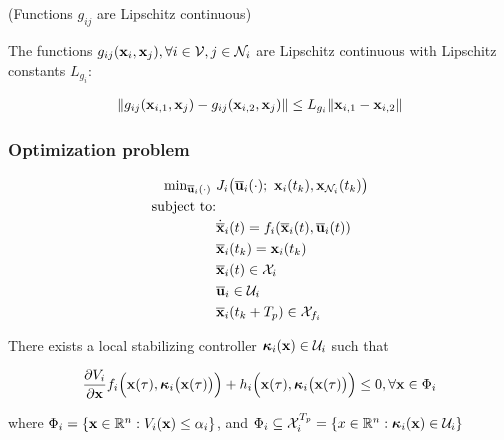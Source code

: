 \begin{gg_box}
\begin{assumption} (Functions $g_{ij}$ are Lipschitz continuous)

  The functions $g_{ij}(\bm{\mathbf{x}}_i, \bm{\mathbf{x}}_j), \forall i \in \mathcal{V}, j \in \mathcal{N}_i$ are
  Lipschitz continuous with Lipschitz constants $L_{g_i}$:

  \begin{align}
    \| g_{ij}(\bm{\mathbf{x}}_{i,1}, \bm{\mathbf{x}}_j) - g_{ij}(\bm{\mathbf{x}}_{i,2}, \bm{\mathbf{x}}_j)\| \leq L_{g_i} \|\bm{\mathbf{x}}_{i,1} - \bm{\mathbf{x}}_{i,2} \|
  \end{align}

  \label{ass:g_ij_Lipschitz}
\end{assumption}
\end{gg_box}

\subsubsection{Optimization problem}

\begin{align}
  \text{min}_{\overline{\bm{\mathbf{u}}}_i (\cdot)}\ &
    J_i \big(\overline{\bm{\mathbf{u}}}_i (\cdot);\ \bm{\mathbf{x}}_i(t_k), \bm{\mathbf{x}}_{\mathcal{N}_i}(t_k)\big) \\
  \text{subject to:} & \\
  & \dot{\overline{\bm{\mathbf{x}}}}_i(t) = f_i (\overline{\bm{\mathbf{x}}}_i (t), \overline{\bm{\mathbf{u}}}_i (t)) \\
  & \overline{\bm{\mathbf{x}}}_i (t_k) = \bm{\mathbf{x}}_i (t_k) \\
  & \overline{\bm{\mathbf{x}}}_i (t) \in \mathcal{X}_i \\
  & \overline{\bm{\mathbf{u}}}_i \in \mathcal{U}_i \\
  & \overline{\bm{\mathbf{x}}}_i (t_k + T_p) \in \mathcal{X}_{f_i} \\
\end{align}

\begin{gg_box}
\begin{assumption}

  There exists a local stabilizing controller
  $\bm{\mathbf{\kappa}}_i(\bm{\mathbf{x}}) \in \mathcal{U}_i$ such that

  \begin{align}
    \dfrac{\partial V_i}{\partial \bm{\mathbf{x}}} f_i \Big(\bm{\mathbf{x}}(\tau), \bm{\mathbf{\kappa}}_i\big(\bm{\mathbf{x}}(\tau)\big)\Big) +
      h_i\Big(\bm{\mathbf{x}}(\tau), \bm{\mathbf{\kappa}}_i \big(\bm{\mathbf{x}}(\tau)\big)\Big) \leq 0, \forall \bm{\mathbf{x}} \in \Phi_i
  \end{align}

  where $\Phi_i = \{\bm{\mathbf{x}} \in \mathbb{R}^n : V_i(\bm{\mathbf{x}}) \leq \alpha_i \}$, and
  $\Phi_i \subseteq \mathcal{X}_i^{T_p} = \{x \in \mathbb{R}^n : \bm{\mathbf{\kappa}}_i(\bm{\mathbf{x}}) \in \mathcal{U}_i\}$

  \label{ass:local_controller_k}
\end{assumption}
\end{gg_box}


